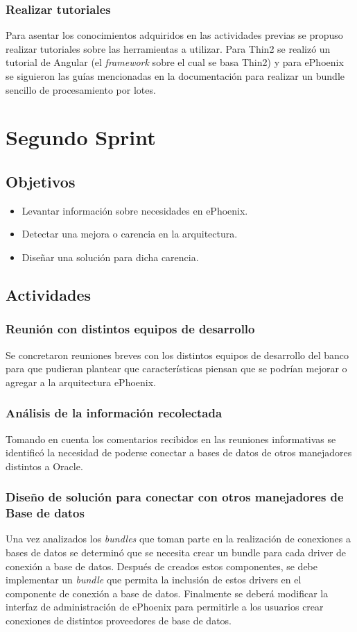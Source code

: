 \subsubsection{Realizar tutoriales}
Para asentar los conocimientos adquiridos en las actividades previas se propuso
realizar tutoriales sobre las herramientas a utilizar. Para Thin2 se realizó un
tutorial de Angular (el \emph{framework} sobre el cual se basa Thin2) y para ePhoenix
se siguieron las guías mencionadas en la documentación para realizar un bundle sencillo
de procesamiento por lotes.

\section{Segundo Sprint}

\subsection{Objetivos}
\begin{itemize}
  \item Levantar información sobre necesidades en ePhoenix.
  \item Detectar una mejora o carencia en la arquitectura.
  \item Diseñar una solución para dicha carencia.
\end{itemize}
\subsection{Actividades}
\subsubsection{Reunión con distintos equipos de desarrollo}
Se concretaron reuniones breves con los distintos equipos de desarrollo del banco
para que pudieran plantear que características piensan que se podrían mejorar o agregar a la
arquitectura ePhoenix.
\subsubsection{Análisis de la información recolectada}
Tomando en cuenta los comentarios recibidos en las reuniones informativas se identificó la
necesidad de poderse conectar a bases de datos de otros manejadores distintos a Oracle.
\subsubsection{Diseño de solución para conectar con otros manejadores de Base de datos}
Una vez analizados los \emph{bundles} que toman parte en la realización de conexiones a bases
de datos se determinó que se necesita crear un bundle para cada driver de conexión a base de
datos. Después de creados estos componentes, se debe implementar un \emph{bundle} que permita
la inclusión de estos drivers en el componente de conexión a base de datos. Finalmente se deberá
modificar la interfaz de administración de ePhoenix para permitirle a los usuarios
crear conexiones de distintos proveedores de base de datos.

